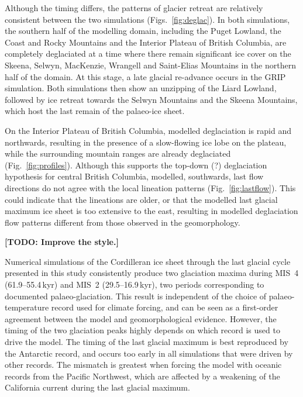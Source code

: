 \documentclass[tc, ms]{copernicus}
\newcommand{\todo}[1]{\textbf{[TODO: #1]}}
\begin{document}
Although the timing differs, the patterns of glacier retreat are relatively
consistent between the two simulations (Figs.~\ref{fig:deglac}). In both
simulations, the southern half of the modelling domain, including the Puget
Lowland, the Coast and Rocky Mountains and the Interior Plateau of British
Columbia, are completely deglaciated at a time where there remain significant
ice cover on the Skeena, Selwyn, MacKenzie, Wrangell and Saint-Elias Mountains
in the northern half of the domain. At this stage, a late glacial re-advance
occurs in the GRIP simulation. Both simulations then show an unzipping of the
Liard Lowland, followed by ice retreat towards the Selwyn Mountains and the
Skeena Mountains, which host the last remain of the palaeo-ice sheet.

On the Interior Plateau of British Columbia, modelled deglaciation is rapid
and northwards, resulting in the presence of a slow-flowing ice lobe on the
plateau, while the surrounding mountain ranges are already deglaciated
(Fig.~\ref{fig:profiles}). Although this supports the top-down (?)
deglaciation hypothesis for central British Columbia, modelled, southwards,
last flow directions do not agree with the local lineation patterns
(Fig.~\ref{fig:lastflow}). This could indicate that the lineations are older,
or that the modelled last glacial maximum ice sheet is too extensive to the
east, resulting in modelled deglaciation flow patterns different from those
observed in the geomorphology.

\conclusions
\label{sec:concl}

\todo{Improve the style.}

Numerical simulations of the Cordilleran ice sheet through the last glacial
cycle presented in this study consistently produce two glaciation maxima during
MIS~4 (61.9--55.4\,\unit{kyr}) and MIS~2 (29.5--16.9\,\unit{kyr}), two periods
corresponding to documented palaeo-glaciation. This result is independent
of the choice of palaeo-temperature record used for climate forcing, and
can be seen as a first-order agreement between the model and geomorphological
evidence. However, the timing of the two glaciation peaks highly depends on
which record
is used to drive the model. The timing of the last glacial maximum is best
reproduced by the Antarctic record, and occurs too early in all simulations
that were driven by other records. The mismatch is greatest when forcing the
model with oceanic records from the Pacific Northwest, which are affected by a
weakening of the California current during the last glacial maximum.
\end{document}
